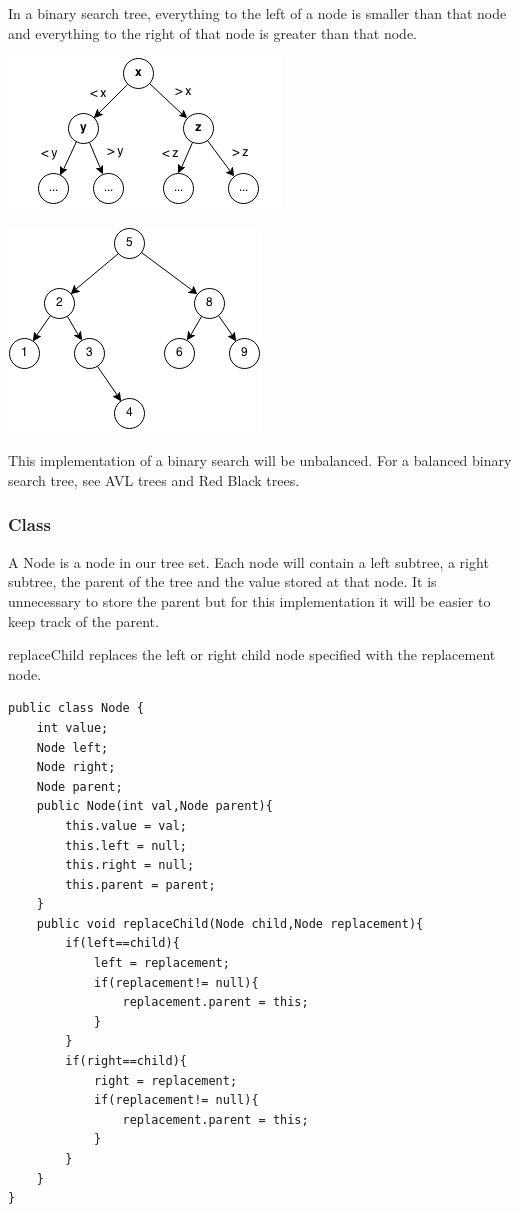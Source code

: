 \documentclass[11pt,oneside]{book}
\makeatletter
\def\maxwidth#1{\ifdim\Gin@nat@width>#1 #1\else\Gin@nat@width\fi}
\makeatother
\begin{document}
In a binary search tree, everything to the left of a node is smaller than that node and everything to the right of that node is greater than that node.

\vspace{5px}\includegraphics[width=\maxwidth{\textwidth}]{bstcompare.png}

\vspace{5px}\includegraphics[width=\maxwidth{\textwidth}]{bst.png}

This implementation of a binary search will be unbalanced. For a balanced binary search tree, see AVL trees and Red Black trees.

\subsubsection{Class}

A Node is a node in our tree set. Each node will contain a left subtree, a right subtree, the parent of the tree and the value stored at that node. It is unnecessary to store the parent but for this implementation it will be easier to keep track of the parent.

replaceChild replaces the left or right child node specified with the replacement node.

\begin{lstlisting}
public class Node {
    int value;
    Node left;
    Node right;
    Node parent;
    public Node(int val,Node parent){
        this.value = val;
        this.left = null;
        this.right = null;
        this.parent = parent;
    }
    public void replaceChild(Node child,Node replacement){
        if(left==child){
            left = replacement;
            if(replacement!= null){
                replacement.parent = this;
            }
        }
        if(right==child){
            right = replacement;
            if(replacement!= null){
                replacement.parent = this;
            }
        }
    }
}
\end{lstlisting}
\end{document}
